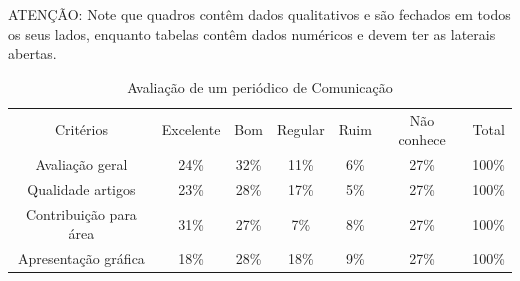 \documentclass[12pt]{article}
\begin{document}

ATENÇÃO: Note que quadros contêm dados qualitativos e são fechados em todos os seus lados, enquanto tabelas contêm dados numéricos e devem ter as laterais abertas.

\begin{table}[H]
\label{tab1}
\centering
\caption{Avaliação de um periódico de Comunicação } 
\begin{tabular}{c|c|c|c|c|c|c}
\cline{1-7}
Critérios & Excelente & Bom & Regular & Ruim & Não conhece & Total\\ \cline{1-7}
Avaliação geral & 24\% & 32\% & 11\% & 6\% & 27\% & 100\%\\ \cline{1-7}
Qualidade artigos & 23\% & 28\% & 17\% & 5\% & 27\% & 100\% \\ \cline{1-7}
Contribuição para área & 31\% & 27\% & 7\% & 8\% & 27\% & 100\%\\ \cline{1-7}
Apresentação gráfica & 18\% & 28\% & 18\% & 9\% & 27\% & 100\% \\ \cline{1-7}
\end{tabular}
\vspace{0.3cm}
{\footnotesize{}} %
\end{table}

\end{document}
